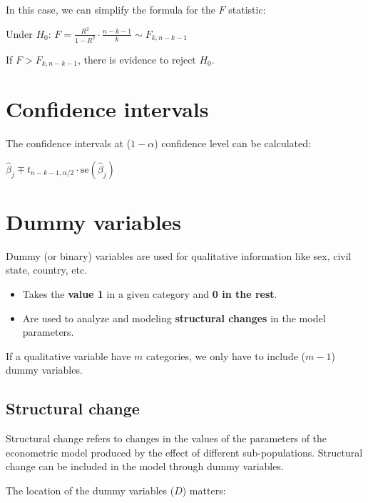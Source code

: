 \documentclass[10pt, a4paper, landscape]{article}
\newcommand{\se}{\mathrm{se}}
\begin{document}
\begin{multicols}{3}
		In this case, we can simplify the formula for the $F$ statistic:
		
		\begin{center}
			Under $H_{0}$: \quad $F = \frac{R^{2}}{1 - R^{2}} \cdot \frac{n - k - 1}{k} \sim F_{k, n - k - 1}$
		\end{center}
		
		If $F > F_{k, n - k - 1}$, there is evidence to reject $H_{0}$.
		
		\section*{Confidence intervals}
		
		The confidence intervals at ($1 - \alpha$) confidence level can be calculated:
		
		\begin{center}
			$\hat{\beta}_{j} \mp t_{n - k - 1, \alpha/2} \cdot \se(\hat{\beta}_{j})$
		\end{center}
		
		\columnbreak
		
		\section*{Dummy variables}
		
		Dummy (or binary) variables are used for qualitative information like sex, civil state, country, etc.
		
		\begin{itemize}[leftmargin=*]
			\item Takes the \textbf{value 1} in a given category and \textbf{0 in the rest}.
			\item Are used to analyze and modeling \textbf{structural changes} in the model parameters.
		\end{itemize}
		
		If a qualitative variable have $m$ categories, we only have to include ($m - 1$) dummy variables.
		
		\subsection*{Structural change}
		
		Structural change refers to changes in the values of the parameters of the econometric model produced by the effect of different sub-populations. Structural change can be included in the model through dummy variables.
		
		The location of the dummy variables ($D$) matters:
		

\end{multicols}
\end{document}

